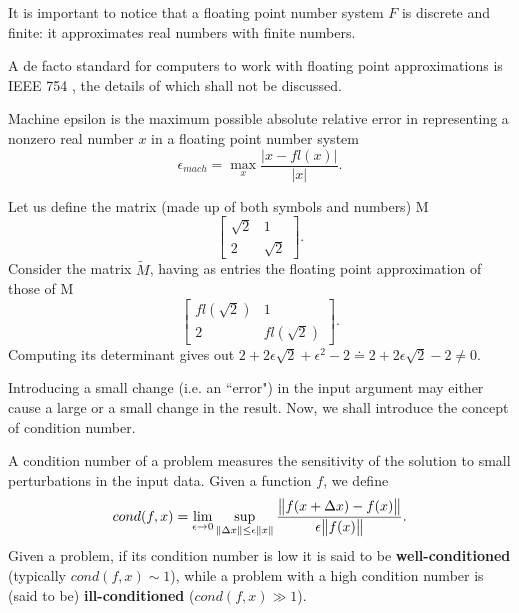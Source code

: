 It is important to notice that a floating point number system \(F\) is discrete and finite: it approximates real numbers with
finite numbers.

A de facto standard for computers to work with floating point approximations is IEEE 754 \cite{ieeefp}, the details of which
shall not be discussed.

\begin{definition}
    Machine epsilon is the maximum possible absolute relative error in representing a nonzero real number \(x\) in a floating point
    number system
    \[\epsilon_{mach} = \max \limits_{x} \dfrac{\vert x - fl(x) \vert}{\vert x \vert}.\]
\end{definition}

\begin{example}
    Let us define the matrix (made up of both symbols and numbers) M
    \[
        \begin{bmatrix}
            \sqrt{2}  &   1    \\
                2     & \sqrt{2}
        \end{bmatrix}.
    \]
    Consider the matrix \( \tilde{M} \), having as entries the floating point approximation of those of M
    \[
        \begin{bmatrix}
            fl(\sqrt{2})      &         1      \\
                2             &    fl(\sqrt{2})
        \end{bmatrix}.
    \]
    Computing its determinant gives out \( 2  +2\epsilon\sqrt{2} + \epsilon^2 - 2 \doteq 2 + 2\epsilon\sqrt{2} -2 \neq 0 \).
\end{example}

Introducing a small change (i.e. an ``error") in the input argument may either cause a large or a small change in the result.
Now, we shall introduce the concept of condition number.

\begin{definition}
    A condition number of a problem measures the sensitivity of the solution to small perturbations in the input data.
    Given a function \(f \), we define
    \[
        cond(f, x) = \lim_{\epsilon \to 0} \sup \limits_{\norm{\Delta x} \leq \epsilon \norm{x}}
        \dfrac{\norm{f(x+\Delta x) - f(x)}}{\epsilon \norm{f(x)}}.
    \]
    Given a problem, if its condition number is low it is said to be \textbf{well-conditioned} (typically \( cond(f, x) \sim 1 \)),
    while a problem with a high condition number is (said to be) \textbf{ill-conditioned} (\( cond(f, x) \gg 1 \)).
\end{definition}

